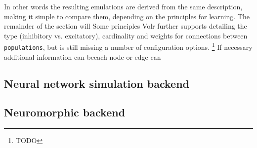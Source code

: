 \documentclass[report.tex]{subfiles}
\begin{document}
In other words the resulting emulations are derived from the same description, making it simple to compare them, depending on the principles for learning.
The remainder of the section will
Some principles
Volr further supports detailing the type (inhibitory vs. excitatory), cardinality and weights for connections between \texttt{populations}, but is still missing a number of configuration options.
\footnote{TODO}
If necessary additional information can beeach node or edge can


\subsection{Neural network simulation backend}

\subsection{Neuromorphic backend} \label{sec:neuromorphic}




\end{document}
